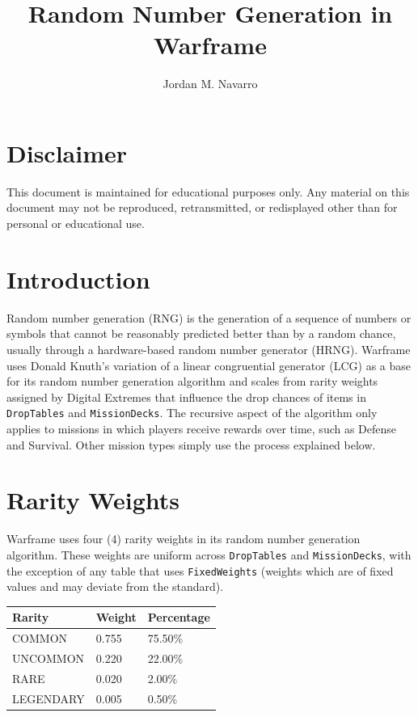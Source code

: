 \documentclass[12pt]{article}
\title{Random Number Generation in Warframe}
\author{Jordan M. Navarro}
\date{}
\begin{document}
\maketitle

\section{Disclaimer}

This document is maintained for educational purposes only. Any material on this document may not be reproduced, retransmitted, or redisplayed other than for personal or educational use.

\section{Introduction}

Random number generation (RNG) is the generation of a sequence of numbers or symbols that cannot be reasonably predicted better than by a random chance, usually through a hardware-based random number generator (HRNG). Warframe uses Donald Knuth's variation of a linear congruential generator (LCG) as a base for its random number generation algorithm and scales from rarity weights assigned by Digital Extremes that influence the drop chances of items in \texttt{DropTables} and \texttt{MissionDecks}. The recursive aspect of the algorithm only applies to missions in which players receive rewards over time, such as Defense and Survival. Other mission types simply use the process explained below.

\section{Rarity Weights}

Warframe uses four (4) rarity weights in its random number generation algorithm. These weights are uniform across \texttt{DropTables} and \texttt{MissionDecks}, with the exception of any table that uses \texttt{FixedWeights} (weights which are of fixed values and may deviate from the standard).

\begin{center}
	\begin{tabular}{|l||l|l|}
		\hline
		Rarity    & Weight & Percentage \\
		\hline
		COMMON    & 0.755  & 75.50\%    \\
		UNCOMMON  & 0.220  & 22.00\%    \\
		RARE      & 0.020  & 2.00\%     \\
		LEGENDARY & 0.005  & 0.50\%     \\
		\hline
	\end{tabular}
\end{center}
\end{document}
